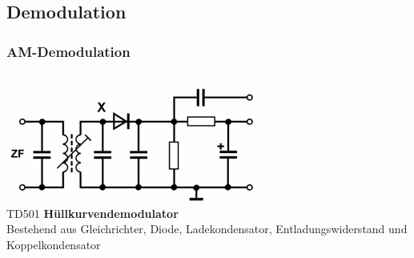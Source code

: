 \subsection{Demodulation}

\begin{frame}
  \frametitle{AM-Demodulation}

  \begin{columns}
    \includegraphics[width=\textwidth,height=\textheight,keepaspectratio]{a12/td503.png}\\
    {\tiny TD501}
    \textbf{Hüllkurvendemodulator}\\[.5em]
    Bestehend aus Gleichrichter, Diode, Ladekondensator, Entladungswiderstand und Koppelkondensator
  \end{columns}
\end{frame}


